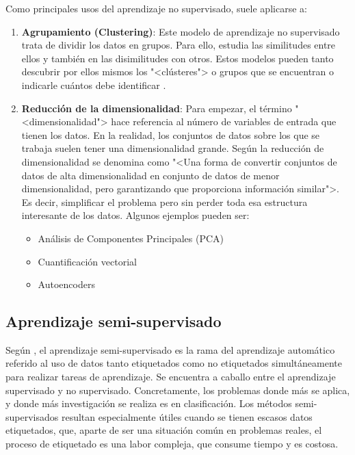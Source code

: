 Como principales usos del aprendizaje no supervisado, suele aplicarse a:
\vspace{-4px}
\begin{enumerate}
    \item \textbf{Agrupamiento (Clustering)}: Este modelo de aprendizaje no
    supervisado trata de dividir los datos en grupos. Para ello, estudia las
    similitudes entre ellos y también en las disimilitudes con otros. Estos
    modelos pueden tanto descubrir por ellos mismos los "<clústeres"> o grupos
    que se encuentran o indicarle cuántos debe identificar \cite{salim:usl}.
    \item \textbf{Reducción de la dimensionalidad}: Para empezar, el término
    "<dimensionalidad"> hace referencia al número de variables de entrada que
    tienen los datos. En la realidad, los conjuntos de datos sobre los que se
    trabaja suelen tener una dimensionalidad grande. Según
    \cite{javatpoint:reduccionsdims} la reducción de dimensionalidad se denomina
    como "<Una forma de convertir conjuntos de datos de alta dimensionalidad en
    conjunto de datos de menor dimensionalidad, pero garantizando que proporciona
    información similar">. Es decir, simplificar el problema pero sin perder
    toda esa estructura interesante de los datos. Algunos ejemplos pueden ser:
    \begin{itemize}
        \item Análisis de Componentes Principales (PCA)
        \item Cuantificación vectorial
        \item Autoencoders
    \end{itemize}
\end{enumerate}

\subsection{Aprendizaje semi-supervisado}

Según \cite{vanEngelen2020}, el aprendizaje semi-supervisado es la rama del
aprendizaje automático referido al uso de datos tanto etiquetados como no
etiquetados simultáneamente para realizar tareas de aprendizaje. Se encuentra a
caballo  entre el aprendizaje supervisado y no supervisado. Concretamente, los
problemas donde más se aplica, y donde más investigación se realiza es en
clasificación. Los métodos semi-supervisados resultan especialmente útiles
cuando se tienen escasos datos etiquetados, que, aparte de ser una situación
común en problemas reales, el proceso de etiquetado es una labor compleja, que
consume tiempo y es costosa.

